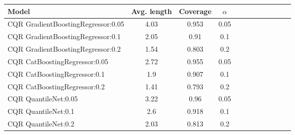 \begin{table}[t] 
\centering 
\small 
\begin{tabular}{lccccccccccc} 
\toprule 
Model & Avg. length & Coverage & $\alpha$ \\ 
\midrule 
 CQR GradientBoostingRegressor:0.05 & 4.03 & 0.953 & 0.05  \\ 
 CQR GradientBoostingRegressor:0.1 & 2.05 & 0.91 & 0.1  \\ 
 CQR GradientBoostingRegressor:0.2 & 1.54 & 0.803 & 0.2  \\ 
 CQR CatBoostingRegressor:0.05 & 2.72 & 0.955 & 0.05  \\ 
 CQR CatBoostingRegressor:0.1 & 1.9 & 0.907 & 0.1  \\ 
 CQR CatBoostingRegressor:0.2 & 1.41 & 0.793 & 0.2  \\ 
 CQR QuantileNet:0.05 & 3.22 & 0.96 & 0.05  \\ 
 CQR QuantileNet:0.1 & 2.6 & 0.918 & 0.1  \\ 
 CQR QuantileNet:0.2 & 2.03 & 0.813 & 0.2  \\ 
\bottomrule 
\end{tabular} 
\end{table} 
